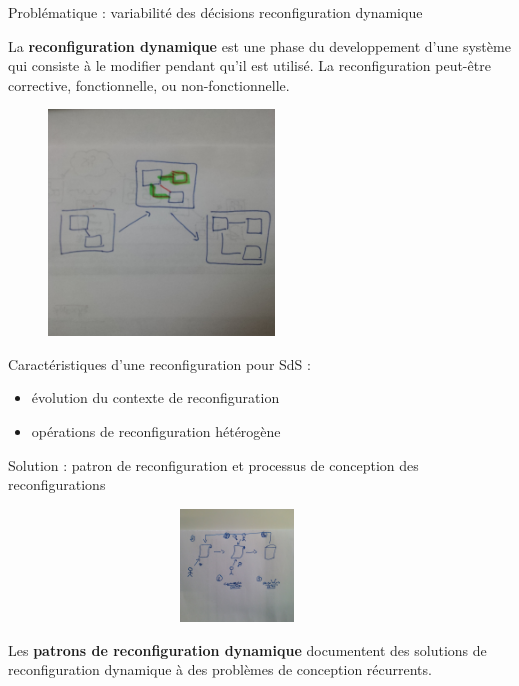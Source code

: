 \begin{frame}{Problématique : variabilité des décisions reconfiguration dynamique}
\begin{block}{}
La \textbf{reconfiguration dynamique} est une phase du
developpement d'une système qui consiste à le modifier pendant qu’il est
utilisé. La reconfiguration peut-être corrective, fonctionnelle,  ou
non-fonctionnelle.
\end{block}
\begin{figure}
\includegraphics[height=6cm]{imgs/description_reconfiguration}
\end{figure}

Caractéristiques d'une reconfiguration pour SdS : 
\begin{itemize}
\item évolution du contexte de reconfiguration
\item opérations de reconfiguration hétérogène
\end{itemize}
\end{frame}
%
\begin{frame}{Solution : patron de reconfiguration et processus de
conception des reconfigurations}
\begin{figure}
\includegraphics[width=10cm, height=3cm]{imgs/slide_application_patron}
\end{figure}
\begin{block}{}
Les \textbf{patrons de reconfiguration dynamique} documentent des solutions de
reconfiguration dynamique à des problèmes de conception récurrents.
\end{block}
\end{frame}

